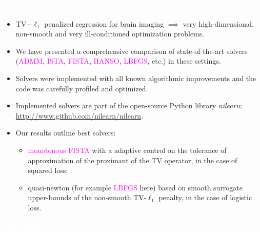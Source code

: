 \documentclass[french]{STIC_poster}
\begin{document}
\begin{frame}[t]
\begin{abox}{\textbf{\textcolor{white}{Conclusion}}}
\begin{itemize}
\item TV$-\ell_{1}$ penalized regression for brain imaging $\implies$ very high-dimensional, non-smooth and very ill-conditioned optimization
problems.
\item We have presented a comprehensive comparison of state-of-the-art
solvers (\textcolor{magenta}{ADMM}, \textcolor{magenta}{ISTA}, \textcolor{magenta}{FISTA}, \textcolor{magenta}{HANSO}, \textcolor{magenta}{LBFGS}, etc.) in these settings.
\item Solvers were implemented with all known
algorithmic improvements and the code was carefully profiled and
optimized.
\item Implemented solvers are part of the open-source Python library \textit{nilearn}: \url{http://www.github.com/nilearn/nilearn}.
\item Our results outline best solvers:
  \footnotesize
  \begin{itemize}
  \item \textcolor{magenta}{monotonous FISTA} with
    a adaptive control on the tolerance of approximation of the  proximant of the TV operator, in the case of squared loss;
  \item quasi-newton (for example \textcolor{magenta}{LBFGS} here) based on smooth surrogate upper-bounds of the non-smooth TV-$\ell_{1}$ penalty, in the case of logistic loss.
  \end{itemize}
\end{itemize}
\end{abox}


\begin{abox}[\textwidth]{\textbf{\textcolor{white}{References}}}

\end{abox}

\end{frame}
\end{document}
